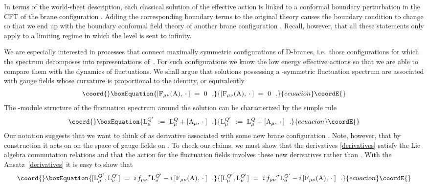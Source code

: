 \documentclass[12pt,a4paper]{article}
\providecommand{\mf}{\mathfrak} %
\providecommand{\mc}{\mathcal} %
\def\tF{{\rm F}}
\def\tA{{\rm A}}
\def\tL{{\rm L}}
\def\asg{{\hat{\mf{g}}}}
\begin{document}
In terms of the world-sheet description, each classical solution of the
effective action is linked to a conformal boundary perturbation in the
CFT of the brane configuration \coordHE{}. Adding the corresponding boundary
terms to the original theory causes the boundary condition to change
so that we end up with the boundary conformal field theory of another
brane configuration \coordHE{}. Recall, however, that all these statements
only apply to a limiting regime in which the level \coordHE{} is sent to infinity.
\smallskip

We are especially interested in processes that connect maximally
symmetric configurations of D-branes, i.e.\ those configurations 
for which the spectrum decomposes into representations of~\myHighlight{$\asg_k$}\coordHE{}. 
For such configurations we know the low energy effective actions 
so that we are able to compare them with the dynamics of fluctuations. 
We shall argue that solutions possessing a \coordHE{}-symmetric fluctuation 
spectrum are associated with gauge fields \myHighlight{$\tA(g)$}\coordHE{} whose curvature 
is proportional to the identity, or equivalently 
\begin{equation}\coord{}\boxEquation{\label{symmsol}
[\tF_{\mu\nu} (\tA),\:\cdot\:]\ =\ 0 \ \ .
}{[\tF_{\mu\nu} (\tA),\:\cdot\:]\ =\ 0 \ \ .
}{ecuacion}\coordE{}\end{equation}
The \coordHE{}-module structure of the fluctuation spectrum around the 
solution can be characterized by the simple rule  
\begin{equation}\coord{}\boxEquation{\label{derivatives}
\tL^{Q^\prime}_{\mu}\ := \ \tL^{Q}_{\mu}+[\tA_{\mu},\:\cdot\:]\ \ .
}{\tL^{Q^\prime}_{\mu}\ := \ \tL^{Q}_{\mu}+[\tA_{\mu},\:\cdot\:]\ \ .
}{ecuacion}\coordE{}\end{equation}
Our notation suggests that we want to think of \myHighlight{$\tL^{Q^\prime}_\mu$}\coordHE{} 
as derivative associated with some new brane configuration \coordHE{}. 
Note, however, that by construction it acts on on the space \myHighlight{$\mc{A}^
{(Q)}$}\coordHE{} of gauge fields on \coordHE{}. To check our claims, we must show that 
the derivatives \eqref{derivatives} satisfy the Lie algebra 
commutation relations and that the action for the fluctuation 
fields involves these new derivatives rather than \myHighlight{$\tL^Q$}\coordHE{}. With 
the Ansatz~\eqref{derivatives} it is easy to show that 
\begin{equation*}\coord{}\boxEquation{
[\tL^{Q^\prime}_{\mu},\tL^{Q^\prime}_{\nu}] \ =\ 
i\,{f_{\mu\nu}}^{\sigma}\tL^{Q^\prime}_{\sigma}-i\,[\tF_{\mu\nu}
(\tA),\:\cdot\:]\ \ . 
}{
[\tL^{Q^\prime}_{\mu},\tL^{Q^\prime}_{\nu}] \ =\ 
i\,{f_{\mu\nu}}^{\sigma}\tL^{Q^\prime}_{\sigma}-i\,[\tF_{\mu\nu}
(\tA),\:\cdot\:]\ \ . 
}{ecuacion}\coordE{}\end{equation*}
\end{document}
